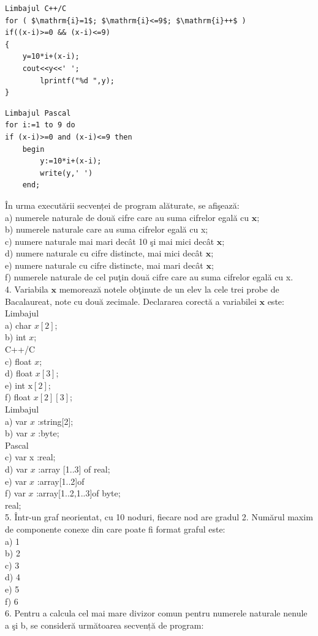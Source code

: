 \documentclass[10pt]{article}
\begin{document}
\begin{verbatim}
Limbajul C++/C
for ( $\mathrm{i}=1$; $\mathrm{i}<=9$; $\mathrm{i}++$ )
if((x-i)>=0 && (x-i)<=9)
{
    y=10*i+(x-i);
    cout<<y<<' ';
        lprintf("%d ",y);
}
\end{verbatim}

\begin{verbatim}
Limbajul Pascal
for i:=1 to 9 do
if (x-i)>=0 and (x-i)<=9 then
    begin
        y:=10*i+(x-i);
        write(y,' ')
    end;
\end{verbatim}

În urma executării secvenței de program alăturate, se afişează:\\
a) numerele naturale de două cifre care au suma cifrelor egală cu $\mathbf{x}$;\\
b) numerele naturale care au suma cifrelor egală cu x;\\
c) numere naturale mai mari decât 10 şi mai mici decât $\mathbf{x}$;\\
d) numere naturale cu cifre distincte, mai mici decât $\mathbf{x}$;\\
e) numere naturale cu cifre distincte, mai mari decât $\mathbf{x}$;\\
f) numerele naturale de cel puţin două cifre care au suma cifrelor egală cu x.\\
4. Variabila $\mathbf{x}$ memorează notele obţinute de un elev la cele trei probe de Bacalaureat, note cu două zecimale. Declararea corectă a variabilei $\mathbf{x}$ este:\\
Limbajul\\
a) char $x[2]$;\\
b) int $x$;\\
C++/C\\
c) float $x$;\\
d) float $x[3]$;\\
e) int $\mathrm{x}[2]$;\\
f) float $x[2][3]$;\\
Limbajul\\
a) var $x$ :string[2];\\
b) var $x$ :byte;\\
Pascal\\
c) var x :real;\\
d) var $x$ :array [1..3] of real;\\
e) var $x$ :array[1..2]of\\
f) var $x$ :array[1..2,1..3]of byte;\\
real;\\
5. Într-un graf neorientat, cu 10 noduri, fiecare nod are gradul 2. Numărul maxim de componente conexe din care poate fi format graful este:\\
a) 1\\
b) 2\\
c) 3\\
d) 4\\
e) 5\\
f) 6\\
6. Pentru a calcula cel mai mare divizor comun pentru numerele naturale nenule a şi b, se consideră următoarea secvență de program:
\end{document}
